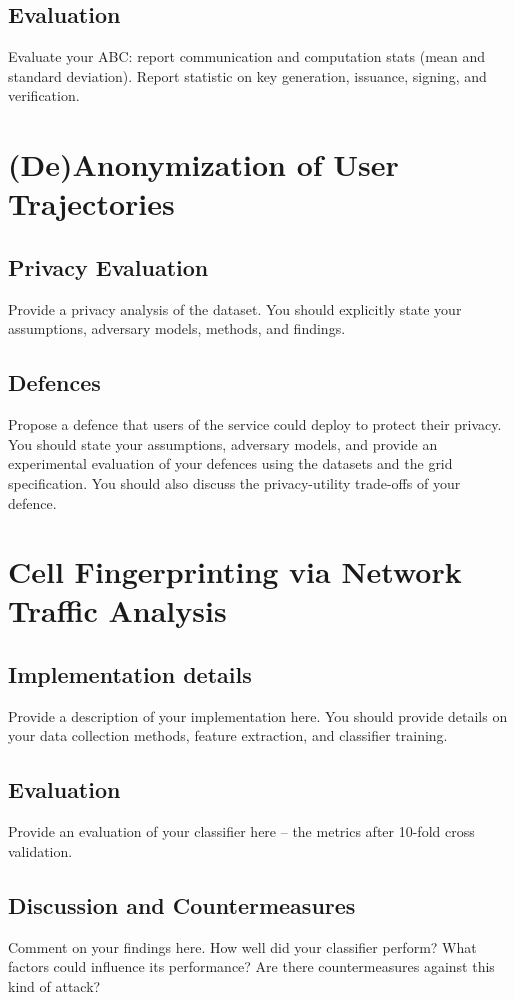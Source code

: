 \documentclass[10pt,conference,compsocconf]{IEEEtran}
\begin{document}
\subsection{Evaluation}
Evaluate your ABC: report communication and computation stats (mean and standard
deviation). Report statistic on key generation, issuance, signing, and
verification.

\section{(De)Anonymization of User Trajectories}

\subsection{Privacy Evaluation}
Provide a privacy analysis of the dataset. You should explicitly state your assumptions, adversary
models, methods, and findings.

\subsection{Defences}
Propose a defence that users of the service could deploy to protect their privacy.  You
should state your assumptions, adversary models, and provide an experimental evaluation of your
defences using the datasets and the grid specification. You should also discuss the
privacy-utility trade-offs of your defence.

\section{Cell Fingerprinting via Network Traffic Analysis}

\subsection{Implementation details}
Provide a description of your implementation here. You should provide details on your data collection methods, feature extraction, and classifier training.

\subsection{Evaluation}
Provide an evaluation of your classifier here -- the metrics after 10-fold cross validation.

\subsection{Discussion and Countermeasures}
Comment on your findings here. How well did your classifier perform? What factors could influence its performance? Are there countermeasures against this kind of attack?



\end{document}
